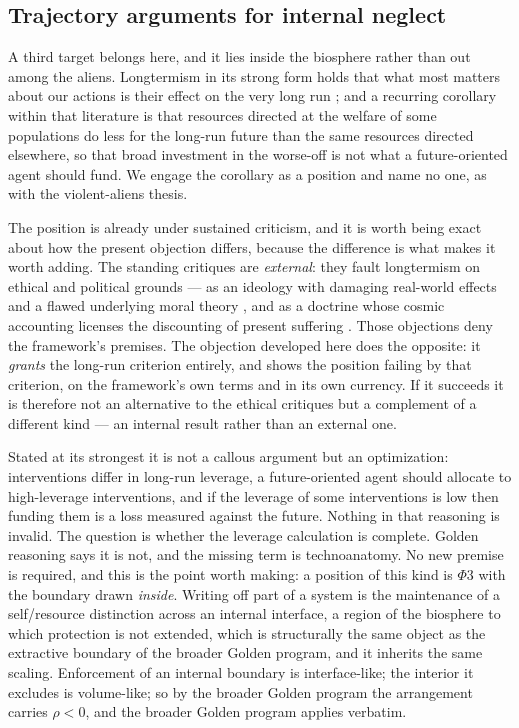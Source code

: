 \documentclass[11pt]{article}
\theoremstyle{plain}
\theoremstyle{definition}
\theoremstyle{remark}
\begin{document}
\subsection{Trajectory arguments for internal neglect}
\label{gr:subsub:neglect}

A third target belongs here, and it lies inside the biosphere rather
than out among the aliens. Longtermism in its strong form holds that
what most matters about our actions is their effect on the very long
run \cite{GM21}; and a recurring corollary within that literature is
that resources directed at the welfare of some populations do less for
the long-run future than the same resources directed elsewhere, so that
broad investment in the worse-off is not what a future-oriented agent
should fund. We engage the corollary as a position and name no one, as
with the violent-aliens thesis.

The position is already under sustained criticism, and it is worth being
exact about how the present objection differs, because the difference is
what makes it worth adding. The standing critiques are \emph{external}:
they fault longtermism on ethical and political grounds --- as an
ideology with damaging real-world effects and a flawed underlying moral
theory \cite{Crary23}, and as a doctrine whose cosmic accounting
licenses the discounting of present suffering \cite{Torres21}. Those
objections deny the framework's premises. The objection developed here
does the opposite: it \emph{grants} the long-run criterion entirely, and
shows the position failing by that criterion, on the framework's own
terms and in its own currency. If it succeeds it is therefore not an
alternative to the ethical critiques but a complement of a different
kind --- an internal result rather than an external one.

Stated at its strongest it is not a callous argument but an
optimization: interventions differ in long-run leverage, a
future-oriented agent should allocate to high-leverage interventions,
and if the leverage of some interventions is low then funding them is a
loss measured against the future. Nothing in that reasoning is invalid.
The question is whether the leverage calculation is complete. Golden reasoning says it is not, and the missing term is technoanatomy.
No new premise is required, and this is the point worth making: a
position of this kind is $\Phi3$ with the boundary drawn \emph{inside}.
Writing off part of a system is the maintenance of a self/resource
distinction across an internal interface, a region of the biosphere
to which protection is not extended, which is structurally the same
object as the extractive boundary of the broader Golden program, and it
inherits the same scaling. Enforcement of an internal boundary is
interface-like; the interior it excludes is volume-like; so by
the broader Golden program the arrangement carries $\rho<0$, and
the broader Golden program applies verbatim.
\end{document}
